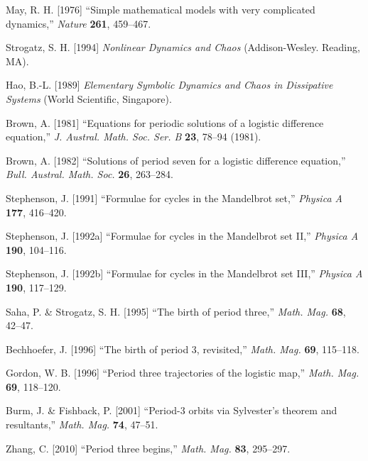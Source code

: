 \documentclass{ws-ijbc}
\begin{document}
\begin{thebibliography}{50}


  May, R. H. [1976]
  ``Simple mathematical models with very complicated dynamics,''
  {\it Nature}
  \textbf{261},
  459--467.

  Strogatz, S. H. [1994]
  {\it Nonlinear Dynamics and Chaos}
  (Addison-Wesley. Reading, MA).

  Hao, B.-L. [1989]
  {\it Elementary Symbolic Dynamics and Chaos in  Dissipative Systems}
  (World Scientific, Singapore).

  Brown, A. [1981]
  ``Equations for periodic solutions of a logistic difference equation,''
  {\it J. Austral. Math. Soc. Ser. B}
  \textbf{23},
  78--94
  (1981).

  Brown, A. [1982]
  ``Solutions of period seven for a logistic difference equation,''
  {\it Bull. Austral. Math. Soc.}
  \textbf{26},
  263--284.

  Stephenson, J. [1991]
  ``Formulae for cycles in the Mandelbrot set,''
  {\it Physica A}
  \textbf{177},
  416--420.

  Stephenson, J. [1992a]
  ``Formulae for cycles in the Mandelbrot set II,''
  {\it Physica A}
  \textbf{190},
  104--116.

  Stephenson, J. [1992b]
  ``Formulae for cycles in the Mandelbrot set III,''
  {\it Physica A}
  \textbf{190},
  117--129.

  Saha, P. \& Strogatz, S. H. [1995]
  ``The birth of period three,''
  {\it Math. Mag.}
  \textbf{68},
  42--47.

  Bechhoefer, J. [1996]
  ``The birth of period 3, revisited,''
  {\it Math. Mag.}
  \textbf{69},
  115--118.

  Gordon, W. B. [1996]
  ``Period three trajectories of the logistic map,''
  {\it Math. Mag.}
  \textbf{69},
  118--120.

  Burm, J. \& Fishback, P. [2001]
  ``Period-3 orbits via Sylvester's theorem and resultants,''
  {\it Math. Mag.}
  \textbf{74},
  47--51.

  Zhang, C. [2010]
  ``Period three begins,''
  {\it Math. Mag.}
  \textbf{83},
  295--297.


\end{thebibliography}
\end{document}
